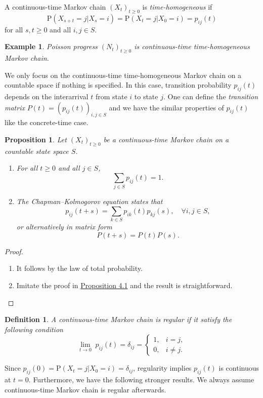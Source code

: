 \documentclass{article}
\newtheorem{definition}{Definition}[section]
\newtheorem{example}{Example}[section]
\newtheorem{proposition}{Proposition}[section]
\theoremstyle{nonumberplain}
\newtheorem{proof}{Proof.}
\begin{document}
\noindent A continuous-time Markov chain $(X_t)_{t\ge0}$ is \emph{time-homogeneous} if
\[
\mathrm{P}(X_{s+t}=j| X_{s}=i)=\mathrm{P}(X_{t}=j| X_{0}=i)=p_{ij}(t)
\]
for all $s,t\ge0$ and all $i,j\in S$. 
\begin{example}
	Poisson progress $(N_t)_{t\ge0}$ is continuous-time time-homogeneous Markov chain.
\end{example}
We only focus on the continuous-time time-homogeneous Markov chain on a countable space if nothing is specified.
In this case, transition probability $p_{ij}(t)$ depends on the interarrival $t$ from state $i$ to state $j$.
\noindent One can define the \emph{transition matrix}	$P(t)=(p_{ij}(t))_{i,j\in S}$ and we have the similar properties of $p_{ij}(t)$ like the concrete-time case.
\begin{proposition}
	Let $(X_t)_{t\ge0}$ be a continuous-time Markov chain on a countable state space $S$. 
	\begin{enumerate}
		\item For all $t\ge 0$ and all $j\in S$,
		\[
		\sum_{j\in S}p_{ij}(t)=1.
		\]
		\item The \emph{Chapman–Kolmogorov equation} states that
		\[
		p_{ij}(t+s)=\sum_{k\in S}p_{ik}(t)p_{kj}(s),\quad\forall i,j\in S,
		\]
		or alternatively in matrix form
		\[
		P(t+s)=P(t)P(s).
		\]
	\end{enumerate}
\end{proposition}
\begin{proof}\hspace{1em}
	\begin{enumerate}
	\item It follows by the law of total probability.
	\item Imitate the proof in \hyperlink{Proposition 4.1}{Proposition 4.1} and the result is straightforward.
	\end{enumerate} 
\end{proof}
\begin{definition}
A continuous-time Markov chain is \emph{regular} if it satisfy the following condition
\[
\lim_{t\to0}\;p_{ij}(t)=\delta_{ij}=
\begin{cases}
1,&i=j,\\
0,&i\ne j.
\end{cases}
\]
\end{definition}
Since $p_{ij}(0)=\mathrm{P}(X_{t}=j| X_{0}=i)=\delta_{ij}$, regularity implies $p_{ij}(t)$ is continuous at $t=0$. Furthermore, we have the following stronger results. We always assume continuous-time Markov chain is regular afterwards.
\end{document}
